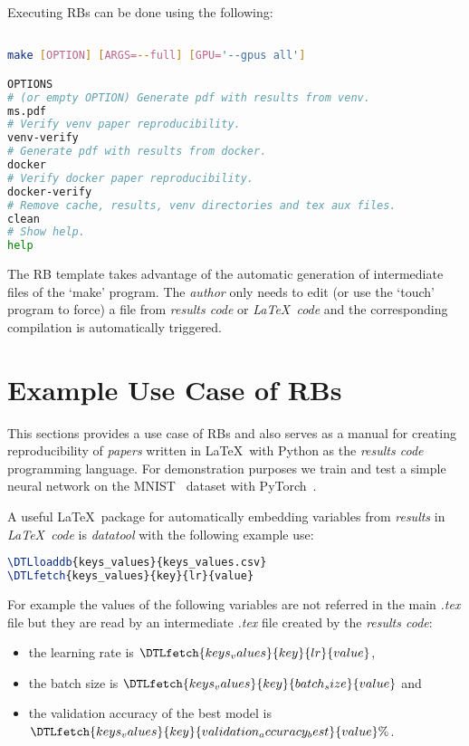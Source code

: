 \documentclass[journal]{IEEEtran}
\begin{document}
Executing RBs can be done using the following:
\begin{lstlisting}[language=Bash, style=lststyle, caption={Makefile call syntax from the shell.}, captionpos=b]

make [OPTION] [ARGS=--full] [GPU='--gpus all']

OPTIONS
# (or empty OPTION) Generate pdf with results from venv.
ms.pdf
# Verify venv paper reproducibility.
venv-verify
# Generate pdf with results from docker.
docker
# Verify docker paper reproducibility.
docker-verify
# Remove cache, results, venv directories and tex aux files.
clean
# Show help.
help
\end{lstlisting}

The RB template takes advantage of the automatic generation of intermediate files of the `make' program.
The \textit{author} only needs to edit (or use the `touch' program to force) a file from \textit{results code} or \textit{\LaTeX\ code} and the corresponding compilation is automatically triggered.

\section{Example Use Case of RBs}
This sections provides a use case of RBs and also serves as a manual for creating reproducibility of \textit{papers} written in \LaTeX\ with Python as the \textit{results code} programming language.
For demonstration purposes we train and test a simple neural network on the MNIST~\cite{lecun2010mnist} dataset with PyTorch~\cite{paszke2019pytorch}.

A useful \LaTeX\ package for automatically embedding variables from \textit{results} in \textit{\LaTeX\ code} is \textit{datatool} with the following example use:
\begin{lstlisting}[language=TeX, style=lststyle, caption={\LaTeX\ datatool example of loading a file that contains pairs of keys and values (keys\_values.csv) generated by a \textit{results code} and getting the value of a key named lr.}, captionpos=b]
\DTLloaddb{keys_values}{keys_values.csv}
\DTLfetch{keys_values}{key}{lr}{value}
\end{lstlisting}

For example the values of the following variables are not referred in the main \textit{.tex} file but they are read by an intermediate \textit{.tex} file created by the \textit{results code}:
\begin{itemize}
	\item the learning rate is $\DTLfetch{keys_values}{key}{lr}{value}$,
	\item the batch size is $\DTLfetch{keys_values}{key}{batch_size}{value}$ and
	\item the validation accuracy of the best model is $\DTLfetch{keys_values}{key}{validation_accuracy_best}{value}\%$.
\end{itemize}
\end{document}
